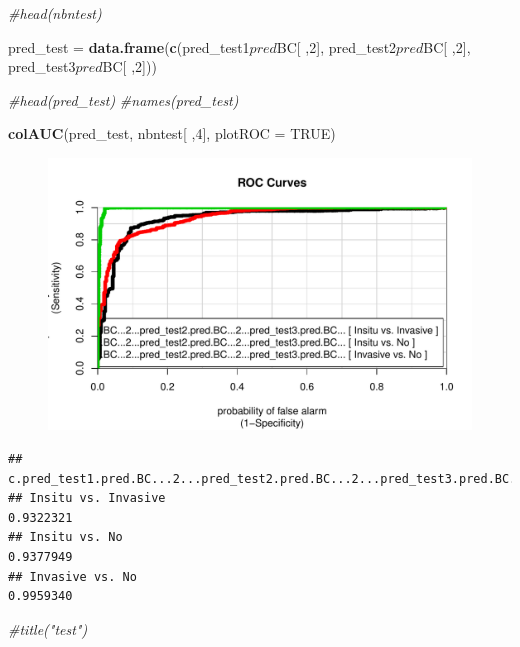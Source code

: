 \documentclass[]{article}
\newenvironment{Shaded}{\begin{snugshade}}{\end{snugshade}}
\newcommand{\KeywordTok}[1]{\textcolor[rgb]{0.13,0.29,0.53}{\textbf{{#1}}}}
\newcommand{\DataTypeTok}[1]{\textcolor[rgb]{0.13,0.29,0.53}{{#1}}}
\newcommand{\DecValTok}[1]{\textcolor[rgb]{0.00,0.00,0.81}{{#1}}}
\newcommand{\StringTok}[1]{\textcolor[rgb]{0.31,0.60,0.02}{{#1}}}
\newcommand{\CommentTok}[1]{\textcolor[rgb]{0.56,0.35,0.01}{\textit{{#1}}}}
\newcommand{\OtherTok}[1]{\textcolor[rgb]{0.56,0.35,0.01}{{#1}}}
\newcommand{\NormalTok}[1]{{#1}}
\begin{document}
\begin{Shaded}
\begin{Highlighting}[]
\CommentTok{#head(nbntest)}



\NormalTok{pred_test =}\StringTok{ }\KeywordTok{data.frame}\NormalTok{(}\KeywordTok{c}\NormalTok{(pred_test1$pred$BC[ ,}\DecValTok{2}\NormalTok{], pred_test2$pred$BC[ ,}\DecValTok{2}\NormalTok{],}
\NormalTok{pred_test3$pred$BC[ ,}\DecValTok{2}\NormalTok{]))}

\CommentTok{#head(pred_test)}
\CommentTok{#names(pred_test)}


\KeywordTok{colAUC}\NormalTok{(pred_test, nbntest[ ,}\DecValTok{4}\NormalTok{], }\DataTypeTok{plotROC =} \OtherTok{TRUE}\NormalTok{)}
\end{Highlighting}
\end{Shaded}

\begin{figure}[htbp]
\centering
\includegraphics{BN_Ass2_files/figure-latex/unnamed-chunk-12-1.pdf}
\end{figure}

\begin{verbatim}
##                     c.pred_test1.pred.BC...2...pred_test2.pred.BC...2...pred_test3.pred.BC...
## Insitu vs. Invasive                                                                 0.9322321
## Insitu vs. No                                                                       0.9377949
## Invasive vs. No                                                                     0.9959340
\end{verbatim}

\begin{Shaded}
\begin{Highlighting}[]
\CommentTok{#title("test")}
\end{Highlighting}
\end{Shaded}
\end{document}
